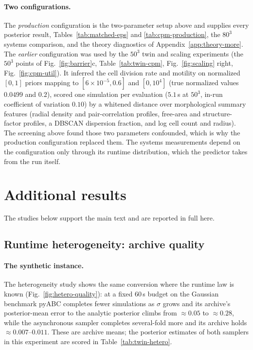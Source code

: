 \documentclass[10pt]{article}
\theoremstyle{plain}
\theoremstyle{definition}
\begin{document}
\paragraph{Two configurations.} The \emph{production} configuration is the two-parameter setup above and supplies every posterior result, Tables~\ref{tab:matched-eps} and \ref{tab:cpm-production}, the $80^3$ systems comparison, and the theory diagnostics of Appendix~\ref{app:theory-more}. The \emph{earlier} configuration was used by the $50^3$ twin and scaling experiments (the $50^3$ points of Fig.~\ref{fig:barrier}c, Table~\ref{tab:twin-cpm}, Fig.~\ref{fig:scaling} right, Fig.~\ref{fig:cpm-util}). It inferred the cell division rate and motility on normalized $[0,1]$ priors mapping to $[6{\times}10^{-5},0.6]$ and $[0,10^4]$ (true normalized values $0.0499$ and $0.2$), scored one simulation per evaluation ($5.1$\,s at $50^3$, in-run coefficient of variation $0.10$) by a whitened distance over morphological summary features (radial density and pair-correlation profiles, free-area and structure-factor profiles, a DBSCAN dispersion fraction, and log cell count and radius). The screening above found those two parameters confounded, which is why the production configuration replaced them. The systems measurements depend on the configuration only through its runtime distribution, which the predictor takes from the run itself.

\section{Additional results}\label{app:moved}
The studies below support the main text and are reported in full here.

\subsection{Runtime heterogeneity: archive quality}

\paragraph{The synthetic instance.} The heterogeneity study shows the same conversion where the runtime law is known (Fig.~\ref{fig:hetero-quality}): at a fixed $60$\,s budget on the Gaussian benchmark pyABC completes fewer simulations as $\sigma$ grows and its archive's posterior-mean error to the analytic posterior climbs from ${\approx}0.05$ to ${\approx}0.28$, while the asynchronous sampler completes several-fold more and its archive holds ${\approx}0.007$--$0.011$. These are archive means; the posterior estimates of both samplers in this experiment are scored in Table~\ref{tab:twin-hetero}.
\end{document}
